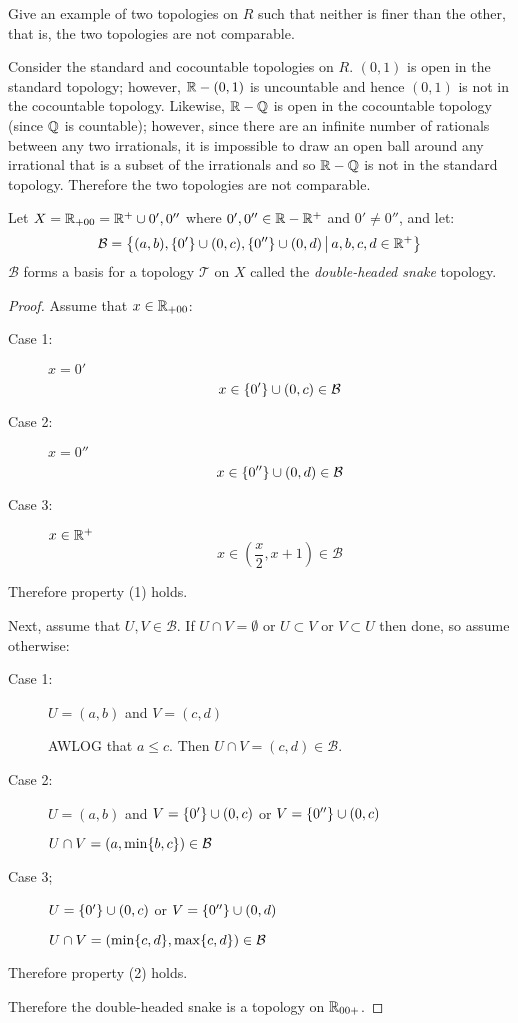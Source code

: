 \documentclass[letterpaper,12pt,fleqn]{article}
\newcommand{\T}{\mathscr{T}}
\newcommand{\B}{\mathcal{B}}
\begin{document}
\begin{example}
  Give an example of two topologies on \(R\) such that neither is finer than the other, that is, the two topologies
  are not comparable.

  Consider the standard and cocountable topologies on \(R\).  \((0,1)\) is open in the standard topology; however,
  \(\mathbb{R}-(0,1)\) is uncountable and hence \((0,1)\) is not in the cocountable topology.  Likewise, \(\mathbb{R}-\mathbb{Q}\) is open
  in the cocountable topology (since \(\mathbb{Q}\) is countable); however, since there are an infinite number of rationals
  between any two irrationals, it is impossible to draw an open ball around any irrational that is a subset of the
  irrationals and so \(\mathbb{R}-\mathbb{Q}\) is not in the standard topology.  Therefore the two topologies are not comparable.
\end{example}

\begin{theorem}
  Let \(X=\mathbb{R}_{+00}=\mathbb{R}^+\cup{0',0''}\) where \(0',0''\in\mathbb{R}-\mathbb{R}^+\) and \(0'\ne0''\), and let:
  \[\B=\setb{(a,b),\set{0'}\cup(0,c),\set{0''}\cup(0,d)}{a,b,c,d\in\R^+}\]
  \(\B\) forms a basis for a topology \(\T\) on \(X\) called the \emph{double-headed snake} topology.
\end{theorem}

\begin{proof}
  Assume that \(x\in\mathbb{R}_{+00}\):
  \begin{description}
  \item[Case 1:] \(x=0'\)
    \[x\in\set{0'}\cup(0,c)\in\B\]
  \item[Case 2:] \(x=0''\)
    \[x\in\set{0''}\cup(0,d)\in\B\]
  \item[Case 3:] \(x\in\mathbb{R}^+\)
    \[x\in\left(\frac{x}{2},x+1\right)\in\B\]
  \end{description}
  Therefore property (1) holds.

  Next, assume that \(U,V\in\B\).  If \(U\cap V=\emptyset\) or \(U\subset V\) or \(V\subset U\) then done, so
  assume otherwise:

  \begin{description}
  \item[Case 1:] \(U=(a,b)\) and \(V=(c,d)\)

    AWLOG that \(a\le c\). Then \(U\cap V=(c,d)\in\B\).

  \item[Case 2:] \(U=(a,b)\) and \(V=\{0'\}\cup(0,c)\) or \(V=\{0''\}\cup(0,c)\)

    \(U\cap V=(a,\min\set{b,c})\in\B\)

  \item[Case 3;] \(U=\{0'\}\cup(0,c)\) or \(V=\{0''\}\cup(0,d)\)

    \(U\cap V=(\min\set{c,d},\max\set{c,d})\in\B\)
  \end{description}

  Therefore property (2) holds.

  Therefore the double-headed snake is a topology on \(\mathbb{R}_{00+}\).
\end{proof}
\end{document}

